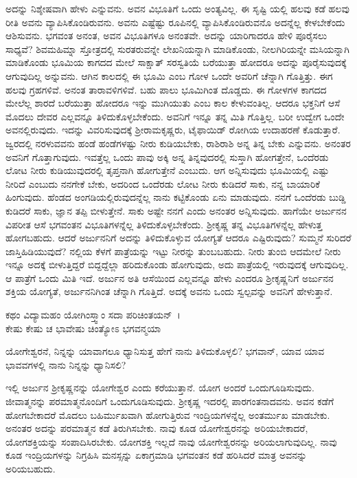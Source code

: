 ಅದನ್ನು ನಿಶ್ಶೇಷವಾಗಿ ಹೇಳು ಎನ್ನುವನು. ಅವನ ವಿಭೂತಿಗೆ ಒಂದು ಅಂತ್ಯವಿಲ್ಲ. ಈ ಸೃಷ್ಟಿ ಯಲ್ಲಿ ಹಲವು ಕಡೆ ಹಲವು ರೀತಿ ಅವನು ವ್ಯಾಪಿಸಿಕೊಂಡಿರುವನು. ಅವನು ಎಷ್ಟೆಷ್ಟು ರೂಪಿನಲ್ಲಿ ವ್ಯಾಪಿಸಿಕೊಂಡಿರುವನೊ ಅದನ್ನೆಲ್ಲ ಕೇಳಬೇಕೆಂದು ಆಶಿಸುವನು. ಭಗವಂತ ಅನಂತ, ಅವನ ವಿಭೂತಿಗಳೂ ಅನಂತವೇ. ಅದನ್ನು ಯಾರಿಗಾದರೂ ಹೇಳಿ ಪೂರೈಸಲು ಸಾಧ್ಯವೆ? ಶಿವಮಹಿಮ್ನಾ ಸ್ತೋತ್ರದಲ್ಲಿ ಸುರತರುವನ್ನೇ ಲೇಖನಿಯನ್ನಾಗಿ ಮಾಡಿಕೊಂಡು, ನೀಲಗಿರಿಯನ್ನೇ ಮಸಿಯನ್ನಾಗಿ ಮಾಡಿಕೊಂಡು ಭೂಮಿಯ ಕಾಗದದ ಮೇಲೆ ಸಾಕ್ಷಾತ್ ಸರಸ್ವತಿಯೆ ಬರೆಯುತ್ತಾ ಹೋದರೂ ಅದನ್ನು ಪೂರೈಸುವುದಕ್ಕೆ ಆಗುವುದಿಲ್ಲ ಅನ್ನುವನು. ಆಗಿನ ಕಾಲದಲ್ಲಿ ಈ ಭೂಮಿ ಎಂಬ ಗೋಳ ಒಂದೇ ಅವರಿಗೆ ಚೆನ್ನಾಗಿ ಗೊತ್ತಿತ್ತು. ಈಗ ಹಲವು ಗ್ರಹಗಳಿವೆ. ಅನಂತ ತಾರಾವಳಿಗಳಿವೆ. ಬಹು ಪಾಲು ಭೂಮಿಗಿಂತ ದೊಡ್ಡದು. ಈ ಗೋಳಗಳ ಕಾಗದದ ಮೇಲೆಲ್ಲ ಶಾರದೆ ಬರೆಯುತ್ತಾ ಹೋದರೂ ಇನ್ನು ಮುಗಿಯುತು ಎಂಬ ಕಾಲ ಕೇಳುವಂತಿಲ್ಲ. ಆದರೂ ಭಕ್ತನಿಗೆ ಆಸೆ ಮೊದಲು ದೇವರ ಎಲ್ಲವನ್ನೂ ತಿಳಿದುಕೊಳ್ಳಬೇಕೆಂದು. ಅವನಿಗೆ ಇನ್ನೂ ತನ್ನ ಮಿತಿ ಗೊತ್ತಿಲ್ಲ. ಬರೀ ಉದ್ವೇಗ ಒಂದೇ ಅವನಲ್ಲಿರುವುದು. ಇದನ್ನು ವಿವರಿಸುವುದಕ್ಕೆ ಶ‍್ರೀರಾಮಕೃಷ್ಣರು, ಟೈಫಾಯಿಡ್ ರೋಗಿಯ ಉದಾಹರಣೆ ಕೊಡುತ್ತಾರೆ. ಜ್ವರದಲ್ಲಿ ನರಳುವವನು ಹಂಡೆ ಹಂಡೆಗಳಷ್ಟು ನೀರು ಕುಡಿಯಬೇಕು, ರಾಶಿರಾಶಿ ಅನ್ನ ತಿನ್ನ ಬೇಕು ಎನ್ನುವನು. ಅನಂತರ ಅವನಿಗೆ ಗೊತ್ತಾಗುವುದು. ಇವತ್ತೆಲ್ಲ ಒಂದು ಪಾವು ಅಕ್ಕಿ ಅನ್ನ ತಿನ್ನವುದರಲ್ಲಿ ಸುಸ್ತಾಗಿ ಹೋಗತ್ತೇನೆ, ಒಂದೆರಡು ಲೋಟ ನೀರು ಕುಡಿಯುವುದರಲ್ಲಿ ತೃಪ್ತನಾಗಿ ಹೋಗುತ್ತೇನೆ ಎಂಬುದು. ಆಗ ಅನ್ನಿಸುವುದು ಭೂಮಿಯಲ್ಲಿ ಎಷ್ಟು ನೀರಿದೆ ಎಂಬುದು ನನಗೇಕೆ ಬೇಕು, ಅದರಿಂದ ಒಂದೆರಡು ಲೋಟ ನೀರು ಕುಡಿದರೆ ಸಾಕು, ನನ್ನ ಬಾಯಾರಿಕೆ ಹಿಂಗುವುದು. ಹೆಂಡದ ಅಂಗಡಿಯಲ್ಲಿರುವುದನ್ನೆಲ್ಲ ನಾನು ಕಟ್ಟಿಕೊಂಡು ಏನು ಮಾಡುವುದು. ನನಗೆ ಒಂದೆರಡು ಬುಡ್ಡಿ ಕುಡಿದರೆ ಸಾಕು, ಜ್ಞಾನ ತಪ್ಪಿ ಬೀಳುತ್ತೇನೆ. ಸಾಕು ಅಷ್ಟೇ ನನಗೆ ಎಂದು ಅನಂತರ ಅನ್ನಿಸುವುದು. ಹಾಗೆಯೇ ಅರ್ಜುನನ ವಿಪರೀತ ಆಸೆ ಭಗವಂತನ ವಿಭೂತಿಗಳನ್ನೆಲ್ಲ ತಿಳಿದುಕೊಳ್ಳಬೇಕೆಂದು. ಶ‍್ರೀಕೃಷ್ಣ ತನ್ನ ವಿಭೂತಿಗಳನ್ನೆಲ್ಲ ಹೇಳುತ್ತ ಹೋಗಬಹುದು. ಆದರೆ ಅರ್ಜುನನಿಗೆ ಅದನ್ನು ತಿಳಿದುಕೊಳ್ಳುವ ಯೋಗ್ಯತೆ ಆದರೂ ಎಷ್ಟಿರುವುದು? ಸುಮ್ಮನೆ ಸುರಿದರೆ ಜಾಸ್ತಿಹಿಡಿಯುವುದೆ? ನಲ್ಲಿಯ ಕೆಳಗೆ ಪಾತ್ರೆಯನ್ನು ಇಟ್ಟು ನೀರನ್ನು ತುಂಬಬಹುದು. ನೀರು ತುಂಬಿ ಆದಮೇಲೆ ನೀರು ಇನ್ನೂ ಅದಕ್ಕೆ ಬೀಳುತ್ತಿದ್ದರೆ ಬಿದ್ದದ್ದೆಲ್ಲಾ ಹರಿದುಕೊಂಡು ಹೋಗುವುದು, ಅದು ಪಾತ್ರೆಯಲ್ಲಿ ಇರುವುದಕ್ಕೆ ಆಗುವುದಿಲ್ಲ. ಆ ಪಾತ್ರೆಗೆ ಒಂದು ಮಿತಿ ಇದೆ. ಅರ್ಜುನ ಅತಿ ಆಸೆಯಿಂದ ಎಲ್ಲವನ್ನೂ ಹೇಳು ಎಂದರೂ ಶ‍್ರೀಕೃಷ್ಣನಿಗೆ ಅರ್ಜುನನ ಶಕ್ತಿಯ ಯೋಗ್ಯತೆ, ಅರ್ಜುನನಿಗಿಂತ ಚೆನ್ನಾಗಿ ಗೊತ್ತಿದೆ. ಅದಕ್ಕೆ ಅವನು ಒಂದು ಸ್ವಲ್ಪವನ್ನು ಅವನಿಗೆ ಹೇಳುತ್ತಾನೆ.

ಕಥಂ ವಿದ್ಯಾಮಹಂ ಯೋಗಿಂಸ್ತ್ವಾಂ ಸದಾ ಪರಿಚಿಂತಯನ್~।\\ಕೇಷು ಕೇಷು ಚ ಭಾವೇಷು ಚಿಂತ್ಯೋಽ ಭಗವನ್ಮಯಾ 

{\small ಯೋಗೇಶ್ವರನೆ, ನಿನ್ನನ್ನು ಯಾವಾಗಲೂ ಧ್ಯಾನಿಸುತ್ತ ಹೇಗೆ ನಾನು ತಿಳಿದುಕೊಳ್ಳಲಿ? ಭಗವಾನ್, ಯಾವ ಯಾವ ಭಾವವಗಳಲ್ಲಿ ನಾನು ನಿನ್ನನ್ನು ಧ್ಯಾನಿಸಲಿ?}

ಇಲ್ಲಿ ಅರ್ಜುನ ಶ‍್ರೀಕೃಷ್ಣನನ್ನು ಯೋಗೇಶ್ವರ ಎಂದು ಕರೆಯುತ್ತಾನೆ. ಯೋಗ ಅಂದರೆ ಒಂದುಗೂಡಿಸುವುದು. ಜೀವಾತ್ಮನನ್ನು ಪರಮಾತ್ಮನೊಂದಿಗೆ ಒಂದುಗೂಡಿಸುವುದು. ಶ‍್ರೀಕೃಷ್ಣ ಇದರಲ್ಲಿ ಪಾರಗಂತನಾದವನು. ಅವನ ಕಡೆಗೆ ಹೋಗಬೇಕಾದರೆ ಮೊದಲು ಬಹಿರ್ಮುಖವಾಗಿ ಹೋಗುತ್ತಿರುವ ಇಂದ್ರಿಯಗಳನ್ನೆಲ್ಲ ಅಂತರ್ಮುಖ ಮಾಡಬೇಕು. ಅನಂತರ ಅದನ್ನು ಪರಮಾತ್ಮನ ಕಡೆ ತಿರುಗಿಸಬೇಕು. ನಾವು ಕೂಡ ಯೋಗೇಶ್ವರನನ್ನು ಅರಿಯಬೇಕಾದರೆ, ಯೋಗಶಕ್ತಿಯನ್ನು ಸಂಪಾದಿಸಿರಬೇಕು. ಯೋಗಶಕ್ತಿ ಇಲ್ಲದೆ ನಾವು ಯೋಗೇಶ್ವರನನ್ನು ಅರಿಯಲಾಗುವುದಿಲ್ಲ. ನಾವು ಕೂಡ ಇಂದ್ರಿಯಗಳನ್ನು ನಿಗ್ರಹಿಸಿ ಮನಸ್ಸನ್ನು ಏಕಾಗ್ರಮಾಡಿ ಭಗವಂತನ ಕಡೆ ಹರಿಸಿದರೆ ಮಾತ್ರ ಅವನನ್ನು ಅರಿಯಬಹುದು.


